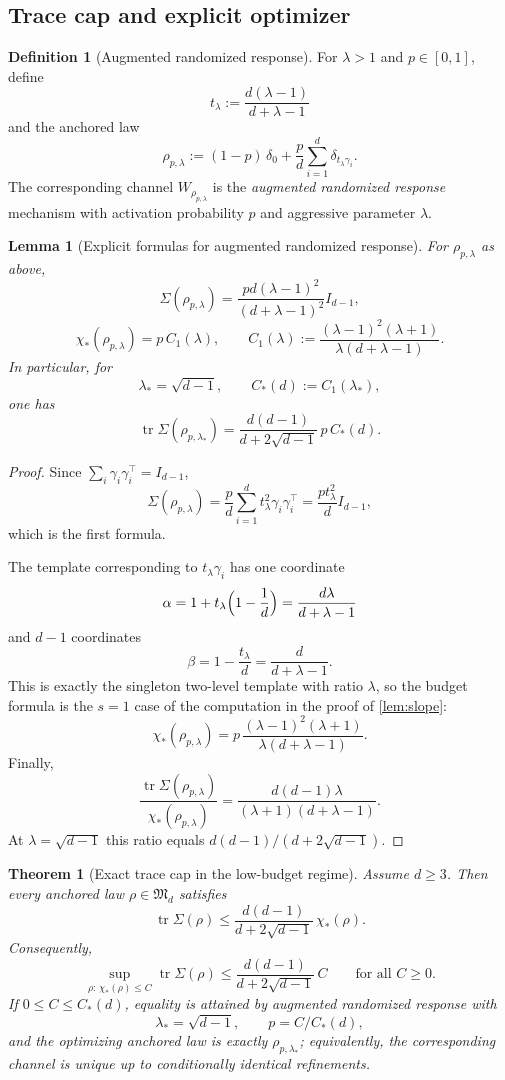 \documentclass[11pt]{amsart}
\newtheorem{theorem}{Theorem}[section]
\newtheorem{lemma}[lemma]{Lemma}
\theoremstyle{definition}
\newtheorem{definition}[definition]{Definition}
\DeclareMathOperator{\tr}{tr}
\newcommand{\fM}{\mathfrak M}
\begin{document}
\subsection{Trace cap and explicit optimizer}

\begin{definition}[Augmented randomized response]\label{def:aug-grr}
For $\lambda>1$ and $p\in[0,1]$, define
\[
t_\lambda:=\frac{d(\lambda-1)}{d+\lambda-1}
\]
and the anchored law
\[
\rho_{p,\lambda}:=(1-p)\,\delta_0+\frac{p}{d}\sum_{i=1}^d \delta_{t_\lambda\gamma_i}.
\]
The corresponding channel $W_{\rho_{p,\lambda}}$ is the \emph{augmented randomized response} mechanism with activation probability $p$ and aggressive parameter $\lambda$.
\end{definition}

\begin{lemma}[Explicit formulas for augmented randomized response]\label{lem:aug-formulas}
For $\rho_{p,\lambda}$ as above,
\[
\Sigma(\rho_{p,\lambda})=\frac{p d(\lambda-1)^2}{(d+\lambda-1)^2}I_{d-1},
\]
\[
\chi_*(\rho_{p,\lambda})=p\,C_1(\lambda),
\qquad
C_1(\lambda):=\frac{(\lambda-1)^2(\lambda+1)}{\lambda(d+\lambda-1)}.
\]
In particular, for
\[
\lambda_*=\sqrt{d-1},
\qquad
C_*(d):=C_1(\lambda_*),
\]
one has
\[
\tr\Sigma(\rho_{p,\lambda_*})=\frac{d(d-1)}{d+2\sqrt{d-1}}\,p\,C_*(d).
\]
\end{lemma}

\begin{proof}
Since $\sum_i \gamma_i\gamma_i^\top=I_{d-1}$,
\[
\Sigma(\rho_{p,\lambda})=\frac{p}{d}\sum_{i=1}^d t_\lambda^2\gamma_i\gamma_i^\top=\frac{p t_\lambda^2}{d}I_{d-1},
\]
which is the first formula.

The template corresponding to $t_\lambda\gamma_i$ has one coordinate
\[
\alpha=1+t_\lambda\Bigl(1-\frac1d\Bigr)=\frac{d\lambda}{d+\lambda-1}
\]
and $d-1$ coordinates
\[
\beta=1-\frac{t_\lambda}{d}=\frac{d}{d+\lambda-1}.
\]
This is exactly the singleton two-level template with ratio $\lambda$, so the budget formula is the $s=1$ case of the computation in the proof of \cref{lem:slope}:
\[
\chi_*(\rho_{p,\lambda})=p\,\frac{(\lambda-1)^2(\lambda+1)}{\lambda(d+\lambda-1)}.
\]
Finally,
\[
\frac{\tr\Sigma(\rho_{p,\lambda})}{\chi_*(\rho_{p,\lambda})}=\frac{d(d-1)\lambda}{(\lambda+1)(d+\lambda-1)}.
\]
At $\lambda=\sqrt{d-1}$ this ratio equals $d(d-1)/(d+2\sqrt{d-1})$.
\end{proof}

\begin{theorem}[Exact trace cap in the low-budget regime]\label{thm:trace-cap}
Assume $d\ge 3$. Then every anchored law $\rho\in\fM_d$ satisfies
\[
\tr\Sigma(\rho)\le \frac{d(d-1)}{d+2\sqrt{d-1}}\,\chi_*(\rho).
\]
Consequently,
\[
\sup_{\rho:\,\chi_*(\rho)\le C}\tr\Sigma(\rho)\le \frac{d(d-1)}{d+2\sqrt{d-1}}\,C
\qquad \text{for all }C\ge 0.
\]
If $0\le C\le C_*(d)$, equality is attained by augmented randomized response with
\[
\lambda_*=\sqrt{d-1},\qquad p=C/C_*(d),
\]
and the optimizing anchored law is exactly $\rho_{p,\lambda_*}$; equivalently, the corresponding channel is unique up to conditionally identical refinements.
\end{theorem}
\end{document}
